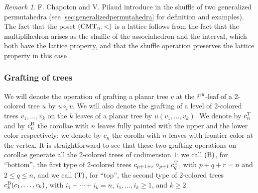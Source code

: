 \documentclass[twoside, 11pt]{amsart}
\theoremstyle{remark}
\newtheorem{remark}[definition]{\sc Remark}
\begin{document}
\begin{remark}
F. Chapoton and V. Pilaud introduce in \cite{CP22} the shuffle of two generalized permutahedra (see \cref{sec:generalizedpermutahedra} for definition and examples).
The fact that the poset $(\mathrm{CMT}_{n}, <)$ is a lattice follows from the fact that the multiplihedron arises as the shuffle of the associahedron and the interval, which both have the lattice property, and that the shuffle operation preserves the lattice property in this case \cite[Corollary 95]{CP22}. 
\end{remark}

\subsubsection{Grafting of trees} \label{sss:grafting}

We will denote the operation of grafting a planar tree $v$ at the $i^{\rm th}$-leaf of a 2-colored tree $u$ by $u \circ_i v$. 
We will also denote the grafting of a level of 2-colored trees $v_1, \ldots, v_k$ on the $k$ leaves of a planar tree by $u(v_1, \ldots, v_k)$. 
We denote by $c^{\mathrm{T}}_n$ and by $c^{\mathrm{B}}_n$ the corollae with $n$ leaves fully painted with the upper and the lower color respectively; we denote by $c_n$ the corolla with $n$ leaves with frontier color at the vertex. 
It is straightforward to see that these two grafting operations on corollae generate all the 2-colored trees of codimension $1$: we call $(\mathrm{B})$, for ``bottom'', the first type of 2-colored trees $c_{p+1+r}\circ_{p+1} c^{\mathrm{T}}_q$, with $p+q+r=n$ and $2\leq q\leq n$, and we call  $(\mathrm{T})$, for ``top'', the second type of 2-colored trees $c^{\mathrm{B}}_k(c_1, \ldots, c_k)$, with $i_1+\cdots+i_k=n$, $i_1, \ldots,i_k\geq 1$, and $k\geq 2$.
\end{document}

